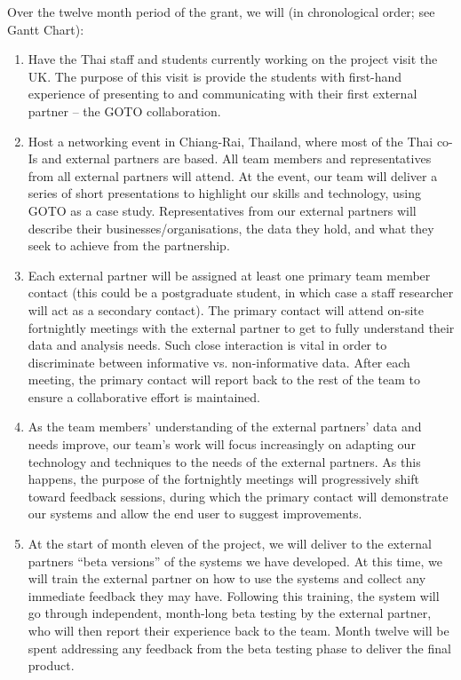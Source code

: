 \documentclass[11pt]{article}
\begin{document}
\noindent
Over the twelve month period of the grant, we will (in chronological order; see Gantt Chart):
\begin{enumerate}[leftmargin=6mm,itemsep=0pt,topsep=1pt]
\item Have the Thai staff and students currently working on the project visit the UK. The purpose of this visit is provide the students with first-hand experience of presenting to and communicating with their first external partner -- the GOTO collaboration.
\item Host a networking event in Chiang-Rai, Thailand, where most of the Thai co-Is and external partners are based. All team members and representatives from all external partners will attend. At the event, our team will deliver a series of short presentations to highlight our skills and technology, using GOTO as a case study. Representatives from our external partners will describe their businesses/organisations, the data they hold, and what they seek to achieve from the partnership.  
\item Each external partner will be assigned at least one primary team member contact (this could be a postgraduate student, in which case a staff researcher will act as a secondary contact). The primary contact will attend on-site fortnightly meetings with the external partner to get to fully understand their data and analysis needs. Such close interaction is vital in order to discriminate between informative vs. non-informative data. After each meeting, the primary contact will report back to the rest of the team to ensure a collaborative effort is maintained.
\item As the team members' understanding of the external partners' data and needs improve, our team's work will focus increasingly on adapting our technology and techniques to the needs of the external partners. As this happens, the purpose of the fortnightly meetings will progressively shift toward feedback sessions, during which the primary contact will demonstrate our systems and allow the end user to suggest improvements. 
\item At the start of month eleven of the project, we will deliver to the external partners ``beta versions'' of the systems we have developed. At this time, we will train the external partner on how to use the systems and collect any immediate feedback they may have. Following this training, the system will go through independent, month-long beta testing by the external partner, who will then report their experience back to the team. Month twelve will be spent addressing any feedback from the beta testing phase to deliver the final product.
\end{enumerate}
\end{document}
